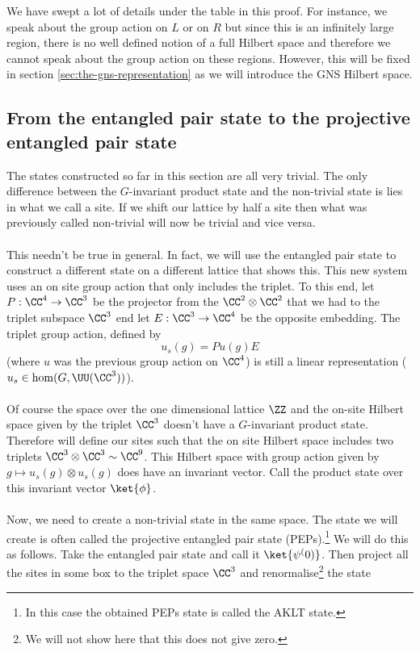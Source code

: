\begin{remark}
	We have swept a lot of details under the table in this proof. For instance, we speak about the group action on $L$ or on $R$ but since this is an infinitely large region, there is no well defined notion of a full Hilbert space and therefore we cannot speak about the group action on these regions. However, this will be fixed in section \ref{sec:the-gns-representation} as we will introduce the GNS Hilbert space.
\end{remark}
\subsection{From the entangled pair state to the projective entangled pair state}\label{sec:from-the-entangled-pair-state-to-the-projective-entangled-pair-state}
The states constructed so far in this section are all very trivial. The only difference between the $G$-invariant product state and the non-trivial state is lies in what we call a site. If we shift our lattice by half a site then what was previously called non-trivial will now be trivial and vice versa.
\\\\
This needn't be true in general. In fact, we will use the entangled pair state to construct a different state on a different lattice that shows this. This new system uses an on site group action that only includes the triplet. To this end, let $P:\CC^4\rightarrow \CC^3$ be the projector from the  $\CC^2\otimes\CC^2$ that we had to the triplet subspace $\CC^3$ end let $E:\CC^3\rightarrow \CC^4$ be the opposite embedding. The triplet group action, defined by
\begin{equation}
	u_s(g)=P u(g) E
\end{equation}
(where $u$ was the previous group action on $\CC^4$) is still a linear representation ($u_s\in\hom(G,\UU(\CC^3))$).
\\\\
Of course the space over the one dimensional lattice $\ZZ$ and the on-site Hilbert space given by the triplet $\CC^3$ doesn't have a $G$-invariant product state. Therefore will define our sites such that the on site Hilbert space includes two triplets $\CC^3\otimes\CC^3\sim \CC^9$. This Hilbert space with group action given by $g\mapsto u_s(g)\otimes u_s(g)$ does have an invariant vector. Call the product state over this invariant vector $\ket{\phi}$.
\\\\
Now, we need to create a non-trivial state in the same space. The state we will create is often called the projective entangled pair state (PEPs).\footnote{In this case the obtained PEPs state is called the AKLT state.} We will do this as follows. Take the entangled pair state and call it $\ket{\psi^(0)}$. Then project all the sites in some box to the triplet space $\CC^3$ and renormalise\footnote{We will not show here that this does not give zero.} the state
